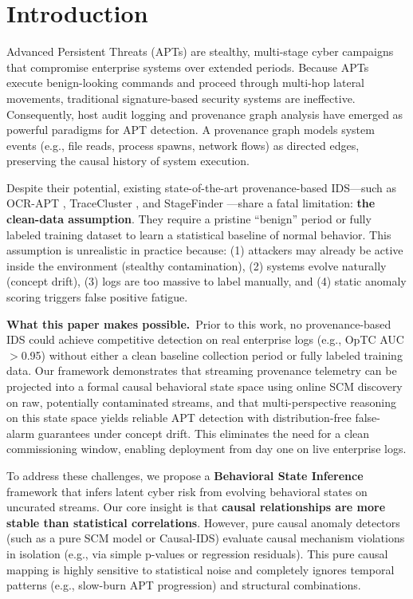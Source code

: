 \section{Introduction}
Advanced Persistent Threats (APTs) are stealthy, multi-stage cyber campaigns that compromise enterprise systems over extended periods. Because APTs execute benign-looking commands and proceed through multi-hop lateral movements, traditional signature-based security systems are ineffective. Consequently, host audit logging and provenance graph analysis have emerged as powerful paradigms for APT detection. A provenance graph models system events (e.g., file reads, process spawns, network flows) as directed edges, preserving the causal history of system execution.

Despite their potential, existing state-of-the-art provenance-based IDS---such as OCR-APT \cite{ocrapt2025}, TraceCluster \cite{tracecluster2026}, and StageFinder \cite{stagefinder2026}---share a fatal limitation: \textbf{the clean-data assumption}. They require a pristine ``benign'' period or fully labeled training dataset to learn a statistical baseline of normal behavior. This assumption is unrealistic in practice because: (1) attackers may already be active inside the environment (stealthy contamination), (2) systems evolve naturally (concept drift), (3) logs are too massive to label manually, and (4) static anomaly scoring triggers false positive fatigue.

\textbf{What this paper makes possible.}~Prior to this work, no provenance-based IDS could achieve competitive detection on real enterprise logs (e.g., OpTC AUC $>$0.95) without either a clean baseline collection period or fully labeled training data. Our framework demonstrates that streaming provenance telemetry can be projected into a formal causal behavioral state space using online SCM discovery on raw, potentially contaminated streams, and that multi-perspective reasoning on this state space yields reliable APT detection with distribution-free false-alarm guarantees under concept drift. This eliminates the need for a clean commissioning window, enabling deployment from day one on live enterprise logs.

To address these challenges, we propose a \textbf{Behavioral State Inference} framework that infers latent cyber risk from evolving behavioral states on uncurated streams. Our core insight is that \textbf{causal relationships are more stable than statistical correlations}. However, pure causal anomaly detectors (such as a pure SCM model or Causal-IDS) evaluate causal mechanism violations in isolation (e.g., via simple p-values or regression residuals). This pure causal mapping is highly sensitive to statistical noise and completely ignores temporal patterns (e.g., slow-burn APT progression) and structural combinations.

